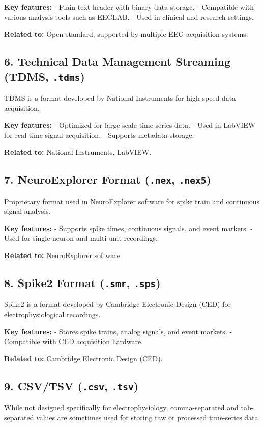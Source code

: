 \documentclass[a4paper,9pt]{extarticle}
\begin{document}
\begin{multicols}{2}
\textbf{Key features:}  
- Plain text header with binary data storage.  
- Compatible with various analysis tools such as EEGLAB.  
- Used in clinical and research settings.

\textbf{Related to:} Open standard, supported by multiple EEG acquisition systems.

\subsection*{6. Technical Data Management Streaming (TDMS, \texttt{.tdms})}
TDMS is a format developed by National Instruments for high-speed data acquisition.

\textbf{Key features:}  
- Optimized for large-scale time-series data.  
- Used in LabVIEW for real-time signal acquisition.  
- Supports metadata storage.

\textbf{Related to:} National Instruments, LabVIEW.

\subsection*{7. NeuroExplorer Format (\texttt{.nex}, \texttt{.nex5})}
Proprietary format used in NeuroExplorer software for spike train and continuous signal analysis.

\textbf{Key features:}  
- Supports spike times, continuous signals, and event markers.  
- Used for single-neuron and multi-unit recordings.

\textbf{Related to:} NeuroExplorer software.

\subsection*{8. Spike2 Format (\texttt{.smr}, \texttt{.sps})}
Spike2 is a format developed by Cambridge Electronic Design (CED) for electrophysiological recordings.

\textbf{Key features:}  
- Stores spike trains, analog signals, and event markers.  
- Compatible with CED acquisition hardware.

\textbf{Related to:} Cambridge Electronic Design (CED).

\subsection*{9. CSV/TSV (\texttt{.csv}, \texttt{.tsv})}
While not designed specifically for electrophysiology, comma-separated and tab-separated values are sometimes used for storing raw or processed time-series data.


\end{multicols}
\end{document}
